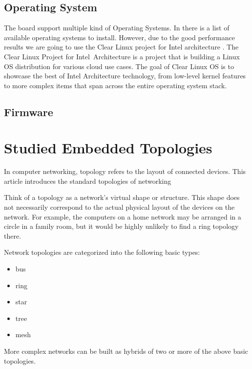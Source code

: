 \subsection{Operating System} 

The board support multiple kind of Operating Systems. In \cite{NUC-OS} there is
a list of available operating systems to install. However, due to the good
performance results \cite{phoronix-clear} we are going to use the Clear Linux
project for Intel architecture \cite{clear-linux}. The Clear Linux Project for
Intel\textregistered\ Architecture is a project that is building a Linux OS
distribution for various cloud use cases. The goal of Clear Linux OS is to
showcase the best of Intel Architecture technology, from low-level kernel
features to more complex items that span across the entire operating system
stack.

\subsection{Firmware}


\section{Studied Embedded Topologies}

In computer networking, topology refers to the layout of connected devices. This
article introduces the standard topologies of networking

Think of a topology as a network's virtual shape or structure. This shape does
not necessarily correspond to the actual physical layout of the devices on the
network. For example, the computers on a home network may be arranged in a
circle in a family room, but it would be highly unlikely to find a ring
topology there.

Network topologies are categorized into the following basic types:

\begin{itemize}
    \item bus
    \item ring
    \item star
    \item tree
    \item mesh
\end{itemize}

More complex networks can be built as hybrids of two or more of the above basic
topologies.

